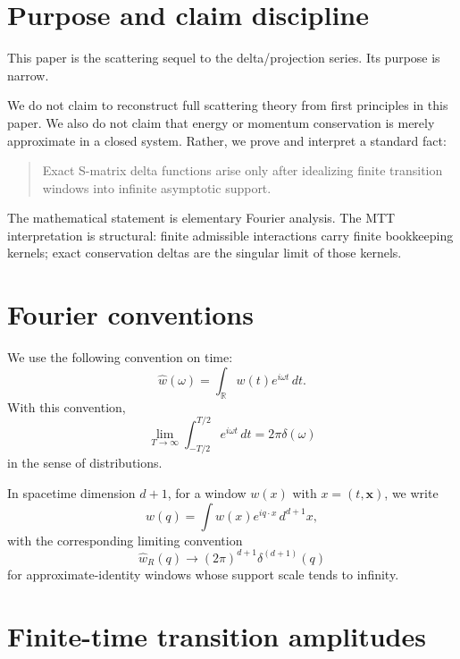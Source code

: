 \documentclass[11pt]{article}
\begin{document}
\section{Purpose and claim discipline}

This paper is the scattering sequel to the delta/projection series.  Its purpose is narrow.

We do not claim to reconstruct full scattering theory from first principles in this paper.  We also do not claim that energy or momentum conservation is merely approximate in a closed system.  Rather, we prove and interpret a standard fact:

\begin{quote}
Exact S-matrix delta functions arise only after idealizing finite transition windows into infinite asymptotic support.
\end{quote}

The mathematical statement is elementary Fourier analysis.  The MTT interpretation is structural: finite admissible interactions carry finite bookkeeping kernels; exact conservation deltas are the singular limit of those kernels.

\begin{center}
\end{center}

\section{Fourier conventions}

We use the following convention on time:
\[
\widehat w(\omega)=\int_{\mathbb R} w(t)e^{i\omega t}\,dt.
\]
With this convention,
\[
\lim_{T\to\infty}\int_{-T/2}^{T/2}e^{i\omega t}\,dt
=2\pi\delta(\omega)
\]
in the sense of distributions.

In spacetime dimension \(d+1\), for a window \(w(x)\) with \(x=(t,\mathbf x)\), we write
\[
\widehat w(q)=\int w(x)e^{iq\cdot x}\,d^{d+1}x,
\]
with the corresponding limiting convention
\[
\widehat w_R(q)\longrightarrow (2\pi)^{d+1}\delta^{(d+1)}(q)
\]
for approximate-identity windows whose support scale tends to infinity.

\section{Finite-time transition amplitudes}
\end{document}
